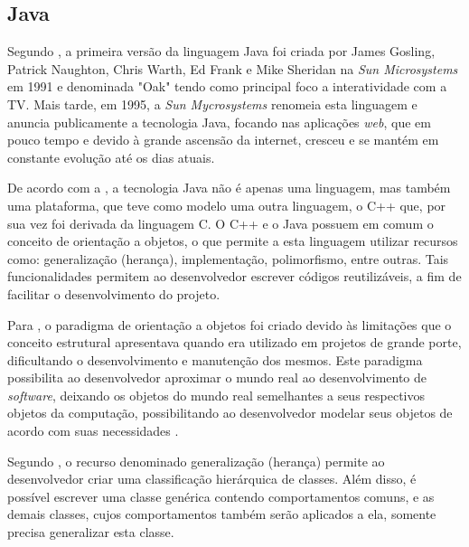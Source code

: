 \subsection{Java}

\par Segundo , a primeira versão da linguagem Java foi criada por James Gosling, Patrick Naughton, Chris Warth, Ed Frank e Mike Sheridan na \textit{Sun Microsystems} em 1991 e denominada "Oak" tendo como principal foco a interatividade com a TV. Mais tarde, em 1995, a \textit{Sun Mycrosystems} renomeia esta linguagem e anuncia publicamente a tecnologia Java, focando nas aplicações \textit{web}, que em pouco tempo e devido à grande ascensão da internet, cresceu e se mantém em constante evolução até os dias atuais.

\par De acordo com a , a tecnologia Java não é apenas uma linguagem, mas também uma plataforma, que teve como modelo uma outra linguagem, o C++ que, por sua vez foi derivada da linguagem C. O C++ e o Java possuem em comum o conceito de orientação a objetos, o que permite a esta linguagem utilizar recursos como: generalização (herança), implementação, polimorfismo, entre outras. Tais funcionalidades permitem ao desenvolvedor escrever códigos reutilizáveis, a fim de facilitar o desenvolvimento do projeto.

\par Para , o paradigma de orientação a objetos foi criado devido às limitações que o conceito estrutural apresentava quando era utilizado em projetos de grande porte, dificultando o desenvolvimento e manutenção dos mesmos. Este paradigma possibilita ao desenvolvedor aproximar o mundo real ao desenvolvimento de \textit{software}, deixando os objetos do mundo real semelhantes a seus respectivos objetos da computação, possibilitando ao desenvolvedor modelar seus objetos de acordo com suas necessidades \cite{tcc_univas_faria_aspectj_programacao_orientada_aspecto_java}.

Segundo , o recurso denominado generalização (herança) permite ao desenvolvedor criar uma classificação hierárquica de classes. Além disso, é possível escrever uma classe genérica contendo comportamentos comuns, e as demais classes, cujos comportamentos também serão aplicados a ela, somente precisa generalizar esta classe.

